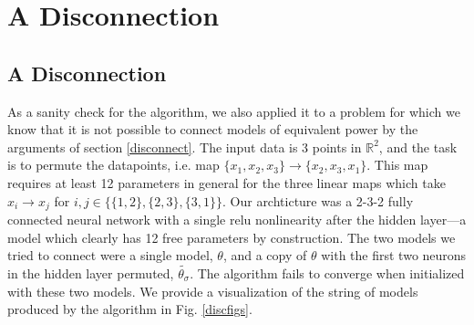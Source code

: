 \section{A Disconnection}
\label{sec:disconnect}

\subsection{A Disconnection}
\label{symdisc}

 As a sanity check for the algorithm, we also applied it to a problem for which we know that it is not possible to connect models of equivalent power by the arguments of section \ref{disconnect}.  The input data is 3 points in $\mathbb{R}^2$, and the task is to permute the datapoints, i.e. map $\{x_1,x_2,x_3\} \to \{x_2,x_3,x_1\}$.  This map requires at least 12 parameters in general for the three linear maps which take $x_i\to x_j$ for $i,j \in \{\{1,2\},\{2,3\},\{3,1\}\}$.  Our archticture was a 2-3-2 fully connected neural network with a single relu nonlinearity after the hidden layer---a model which clearly has 12 free parameters by construction.  The two models we tried to connect were a single model, $\theta$, and a copy of $\theta$ with the first two neurons in the hidden layer permuted, $\tilde{\theta_{\sigma}}$.  The algorithm fails to converge when initialized with these two models.  We provide a visualization of the string of models produced by the algorithm in Fig. \ref{discfigs}.
 
